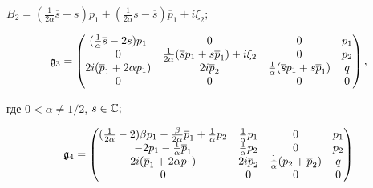 \begin{thm}
$ B_2 =( \frac1{ 2 \alpha}\overline s - s ) p_1 +


( \frac1{ 2 \alpha} s - \overline s ) \overline p_1 + i \xi_2;$


\begin{equation}


\frak g_3 =


\begin{pmatrix}


 (\frac1{\alpha} \overline s - 2 s) p_1 & 0 & 0 & p_1 \\


0 & 


\frac1{2\alpha} ( \overline s p_1 + s \overline p_1) + i \xi_2


& 0 & p_2\\ 


2i (\overline p_1 + 2 \alpha p_1) & 2 i \overline p_2 & 


 \frac1{\alpha} ( \overline s p_1 + s \overline p_1) & q \\


0&0&0&0 


\end{pmatrix}


,


\end{equation} 


где $ 0 < \alpha \ne 1/2 $, $ s \in \Bbb C; $


\begin{equation}


\frak g_4 =


\begin{pmatrix}


( \frac1{2\alpha} - 2 ) \beta p_1 


 -\frac \beta{ 2 \alpha} \overline p_1 + 


\frac1{\alpha}p_2 


& \frac1{\alpha}p_1


 & 0 & p_1 \\


 - 2 p_1 - \frac1{\alpha} \overline p_1 


& \frac1{\alpha}p_2 & 0 & p_2\\ 


2i (\overline p_1 + 2 \alpha p_1) & 2 i \overline p_2 & 


 \frac 1{\alpha} ( p_2 + \overline p_2 ) & q \\


0&0&0&0 


\end{pmatrix}



\end{equation}
\end{thm}
